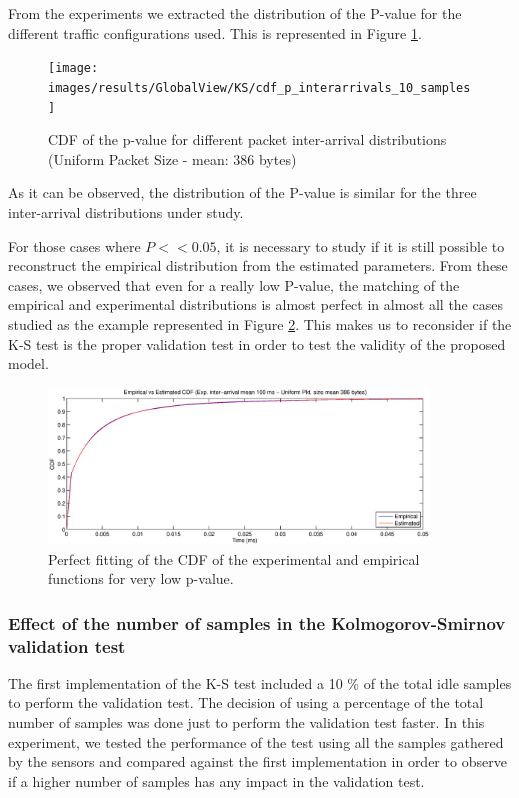 From the experiments we extracted the distribution of the P-value for the different traffic configurations used. This is represented in Figure \ref{fig:cdf_p}.

\begin{figure}[h!]
	\centering
	\texttt{[image: images/results/GlobalView/KS/cdf\_p\_interarrivals\_10\_samples]}
	\caption{CDF of the p-value for different packet inter-arrival distributions (Uniform Packet Size - mean: 386 bytes)}
	\label{fig:cdf_p}
\end{figure}

As it can be observed, the distribution of the P-value is similar for the three inter-arrival distributions under study.

For those cases where ${P<<0.05}$, it is necessary to study if it is still possible to reconstruct the empirical distribution from the estimated parameters. From these cases, we observed that even for a really low P-value, the matching of the empirical and experimental distributions is almost perfect in almost all the cases studied as the example represented in Figure \ref{fig:ks_fail}. This makes us to reconsider if the \acs{K-S} test is the proper validation test in order to test the validity of the proposed model.

\begin{figure}[h!]
	\centering
	\includegraphics[width=0.9\textwidth, trim = 0mm 0mm 6mm 5mm, clip]{images/results/GlobalView/KS/ks_fail}
	\caption{Perfect fitting of the \acs{CDF} of the experimental and empirical functions for very low p-value.}
	\label{fig:ks_fail}
\end{figure}

\subsubsection{Effect of the number of samples in the Kolmogorov-Smirnov validation test} \label{sec:ks_optimization}
The first implementation of the \acs{K-S} test included a 10 \% of the total idle samples to perform the validation test. The decision of using a percentage of the total number of samples was done just to perform the validation test faster. In this experiment, we tested the performance of the test using all the samples gathered by the sensors and compared against the first implementation in order to observe if a higher number of samples has any impact in the validation test.


